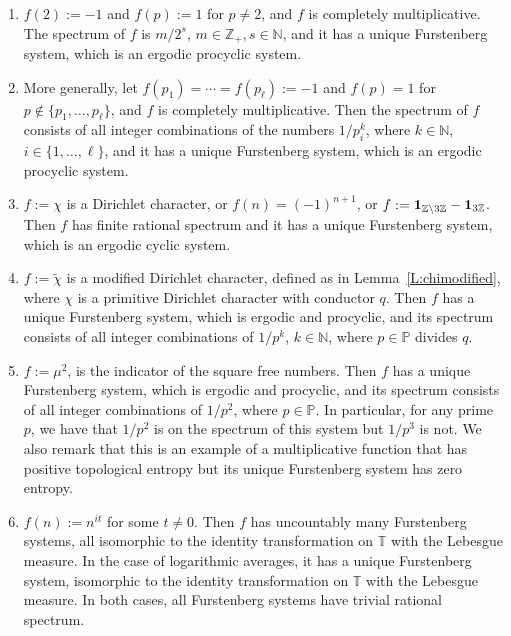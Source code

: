 \documentclass[11pt]{amsart}
\theoremstyle{definition}
\newcommand{\N}{{\mathbb N}}
\renewcommand{\P}{{\mathbb P}}
\newcommand{\T}{{\mathbb T}}
\newcommand{\Z}{{\mathbb Z}}
\begin{document}
\begin{enumerate}
	\item \label{i}  $f(2):=-1$ and $f(p):=1$ for $p\neq 2$,  and $f$ is completely multiplicative. The spectrum of $f$ is $m/2^s$, $m\in\Z_+,s\in\N$,  and it has a unique Furstenberg system, which is an ergodic procyclic system.
	
	\smallskip
	
	\item \label{ii} More generally, let $f(p_1)=\cdots =f(p_\ell):=-1$ and $f(p)=1$ for $p\notin \{p_1,\ldots, p_\ell\}$,  and $f$ is completely multiplicative. Then the  spectrum of $f$ consists of all integer combinations of the numbers $1/p_i^k$, where $k\in \N$, $ i\in \{1,\ldots, \ell\}$,  and it has a unique Furstenberg system, which  is an ergodic procyclic system.
	
	\smallskip
	
	\item\label{iii} $f:=\chi$ is a  Dirichlet character, or $f(n)=(-1)^{n+1}$,   or $f:={\bf 1}_{\Z\setminus 3\Z}- {\bf 1}_{3\Z}$. Then $f$ has finite rational spectrum and it has a unique  Furstenberg system, which  is an ergodic cyclic system.
	
	
	\smallskip
	
	\item\label{iii'} $f:=\tilde{\chi}$ is a modified  Dirichlet character, defined as in Lemma~\ref{L:chimodified}, where $\chi$ is a primitive Dirichlet character with conductor $q$.
	Then $f$ has a unique Furstenberg system, which is ergodic and procyclic, and its spectrum consists of all integer combinations of $1/p^k$, $k\in\N$, where $p\in \P$  divides  $q$. 
	
 
	
	\smallskip
	
	\item \label{iv} $f:=\mu^2$, is the indicator of the square free numbers. Then $f$ has a unique Furstenberg system, which is ergodic and procyclic, and its spectrum consists of all integer combinations of $1/p^2$, where $p\in \P$. In particular, for any prime $p$, we have that $1/p^2$ is on the spectrum of this system but $1/p^3$ is not. We
	also remark that this is an example of a multiplicative function that has positive topological entropy but its unique Furstenberg system has zero entropy.
	
	\smallskip
	
	\item \label{v} $f(n):=n^{it}$ for some $t\neq 0$. Then $f$ has uncountably many   Furstenberg systems, 	 all isomorphic to the  identity transformation  on $\T$ with the Lebesgue measure. In the case of logarithmic averages, it has a unique Furstenberg system, isomorphic to the identity transformation on $\T$ with the Lebesgue measure. In both cases, all Furstenberg systems have trivial rational spectrum.
	

\end{enumerate}
\end{document}
